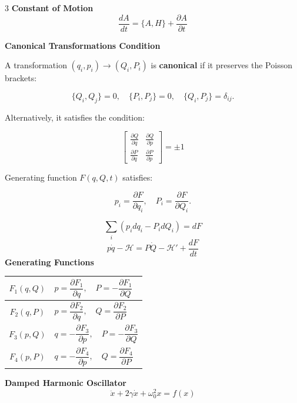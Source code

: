 \documentclass[1pt]{article}
\begin{document}
\begin{multicols}{3}
\textbf{Constant of Motion}
\begin{equation*}
    \frac{dA}{dt} = \{ A, H \} + \frac{\partial A}{\partial t}
\end{equation*}

\textbf{Canonical Transformations Condition}

A transformation \( (q_i, p_i) \to (Q_i, P_i) \) is \textbf{canonical} if it preserves the Poisson brackets:

\[
\{Q_i, Q_j\} = 0, \quad \{P_i, P_j\} = 0, \quad \{Q_i, P_j\} = \delta_{ij}.
\]

Alternatively, it satisfies the condition:

\[
\begin{bmatrix}
\frac{\partial Q}{\partial q} & \frac{\partial Q}{\partial p} \\
\frac{\partial P}{\partial q} & \frac{\partial P}{\partial p}
\end{bmatrix}=\pm1
\]

Generating function \( F(q, Q, t) \) satisfies:

\[
p_i = \frac{\partial F}{\partial q_i}, \quad P_i = \frac{\partial F}{\partial Q_i}.
\]

\begin{equation*}
    \sum_i (p_i dq_i - P_i dQ_i) = dF
\end{equation*}
\[p\dot{q}-\mathcal{H}=P\dot{Q}-\mathcal{H}'+\frac{dF}{dt}\]
\textbf{Generating Functions}
\begin{center}
\begin{tabular}{|c|l|}
\hline
\(F_1(q,Q)\) & \( p=\dfrac{\partial F_1}{\partial q},\quad P=-\dfrac{\partial F_1}{\partial Q}\) \\[4pt] \hline
\(F_2(q,P)\) & \( p=\dfrac{\partial F_2}{\partial q},\quad Q=\dfrac{\partial F_2}{\partial P}\) \\[4pt] \hline
\(F_3(p,Q)\) & \( q=-\dfrac{\partial F_3}{\partial p},\quad P=-\dfrac{\partial F_3}{\partial Q}\) \\[4pt] \hline
\(F_4(p,P)\) & \( q=-\dfrac{\partial F_4}{\partial p},\quad Q=\dfrac{\partial F_4}{\partial P}\) \\[4pt] \hline
\end{tabular}
\end{center}


\textbf{Damped Harmonic Oscillator}
\begin{equation*}
    \ddot{x} + 2\gamma\dot{x} + \omega_0^2 x = f(x)
\end{equation*}


\end{multicols}
\end{document}
